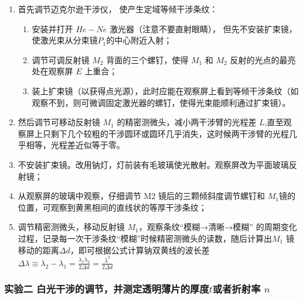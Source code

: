 \documentclass[dvipsnames, svgnames,a4paper,11pt]{article}
\begin{document}
		\begin{enumerate}
			\item 首先调节迈克尔逊干涉仪， 使产生定域等倾干涉条纹：
			
				\begin{enumerate}
					\item 安装并打开 $He-Ne$ 激光器（注意不要直射眼睛）， 但先不安装扩束镜， 使激光束从分束镜$ P_1$的中心附近入射；
					
					\item 调节可调反射镜 $M_2$ 背面的三个螺钉，使得 $M_1$ 和 $M_2$ 反射的光点的最亮处在观察屏 $E$ 上重合；
					
					
					\item 装上扩束镜（以获得点光源），此时应能在观察屏上看到等倾干涉条纹（如观察不到，则可微调固定激光器的螺钉，使得光束能顺利通过扩束镜）。
				\end{enumerate}
			
			\item 然后调节可移动反射镜 $M_1$ 的精密测微头，减小两干涉臂的光程差 $L$,直至观察屏上只剩下几个较粗的干涉圆环或圆环几乎消失，这时候两干涉臂的光程几乎相等，光程差近似等于零。
			
			\item 不安装扩束镜。改用钠灯，灯前装有毛玻璃使光散射。观察屏改为平面玻璃反射镜；
			
			\item 从观察屏的玻璃中观察，仔细调节 M2 镜后的三颗倾斜度调节螺钉和 $M_1$镜的位置，可观察到黄黑相间的直线状的等厚干涉条纹；
			
			\item 调节精密测微头，移动反射镜 $M_1$，观察条纹“模糊→清晰→模糊” 的周期变化过程，记录每一次干涉条纹“模糊”时候精密测微头的读数，随后计算出$M_1$ 镜移动的距离$\Delta d$，即可根据公式计算钠双黄线的波长差$\Delta \lambda\equiv\lambda_2-\lambda_1=\frac{\lambda_1\lambda_2}{2\Delta d}=\frac{\bar{\lambda}^2}{2\Delta d} $

		\end{enumerate}
		
		
		
		
		
		
		
		
		

	\subsubsection{实验二 白光干涉的调节，并测定透明薄片的厚度$t$或者折射率 $n$}
		
\end{document}
